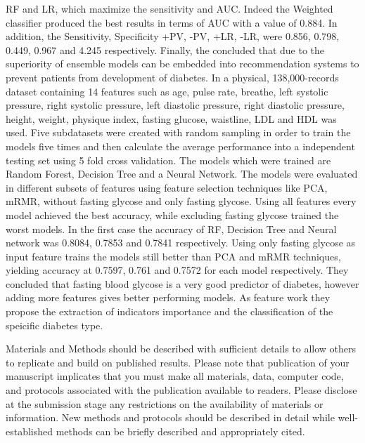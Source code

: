 \documentclass[journal,article,submit,pdftex,moreauthors]{Definitions/mdpi}
\begin{document}
RF and LR, which maximize the sensitivity and AUC. Indeed the Weighted classifier
produced the best results in terms of AUC with a value of 0.884. In addition,
the Sensitivity, Specificity +PV, -PV, +LR, -LR, were 0.856, 0.798, 0.449, 0.967 and
4.245 respectively. Finally, the concluded that due to the superiority of ensemble 
models can be embedded into recommendation systems to prevent patients from development
of diabetes. In \cite{Zou} a physical, 138,000-records dataset containing 
14 features such as age, pulse rate, breathe, left systolic pressure, right systolic 
pressure, left diastolic pressure, right diastolic pressure, height, weight, physique
index, fasting glucose, waistline, LDL and HDL was used. Five subdatasets were created with 
random sampling in order to train the models five times and then calculate the average 
performance into a independent testing set using 5 fold cross validation. The models
which were trained are Random Forest, Decision Tree and a Neural Network. The models
were evaluated in different subsets of features using feature selection techniques like
PCA, mRMR, without fasting glycose and only fasting glycose. Using all features every model
achieved the best accuracy, while excluding fasting glycose trained the worst models. In the 
first case the accuracy of RF, Decision Tree and Neural network was 0.8084, 0.7853 and 
0.7841 respectively. Using only fasting glycose as input feature trains the models still better
than PCA and mRMR techniques, yielding accuracy at 0.7597, 0.761 and 0.7572 for each model
respectively. They concluded that fasting blood glycose is a very good predictor of diabetes, however
adding more features gives better performing models. As feature work they propose 
the extraction of indicators importance and the classification of the speicific diabetes 
type.  



Materials and Methods should be described with sufficient details to allow others to replicate and build on published results. Please note that publication of your manuscript implicates that you must make all materials, data, computer code, and protocols associated with the publication available to readers. Please disclose at the submission stage any restrictions on the availability of materials or information. New methods and protocols should be described in detail while well-established methods can be briefly described and appropriately cited.
\end{document}

